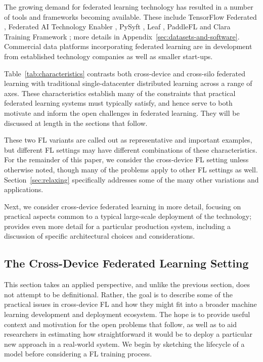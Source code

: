 \documentclass[11pt]{article}
\begin{document}
The growing demand for federated learning technology has resulted in a number of tools and frameworks becoming available. These include TensorFlow Federated \citep{tff}, Federated AI Technology Enabler \citep{FATE}, PySyft \citep{PySyft}, Leaf \citep{Leaf}, PaddleFL \citep{PaddleFL} and Clara Training Framework \citep{ClaraTraining};
more details in Appendix~\ref{sec:datasets-and-software}. Commercial data platforms incorporating federated learning are in development from established technology companies as well as smaller start-ups.

Table~\ref{tab:characteristics} contrasts both cross-device and cross-silo federated learning with traditional single-datacenter distributed learning across a range of axes. These characteristics establish many of the constraints that practical federated learning systems must typically satisfy, and hence serve to both motivate and inform the open challenges in federated learning. They will be discussed at length in the sections that follow.

These two FL variants are called out as representative and important examples, but different FL settings may have different combinations of these characteristics. For the remainder of this paper, we consider the cross-device FL setting unless otherwise noted, though many of the problems apply to other FL settings as well. Section~\ref{sec:relaxing} specifically addresses some of the many other variations and applications.

Next, we consider cross-device federated learning in more detail, focusing on practical aspects common to a typical large-scale deployment of the technology; \citet{bonawitz19sysml} provides even more detail for a particular production system, including a discussion of specific architectural choices and considerations.

\subsection{The Cross-Device Federated Learning Setting}
\label{subsec:cross-device-fl-setting}
This section takes an applied perspective, and unlike the previous section, does not attempt to be definitional. Rather, the goal is to describe some of the practical issues in cross-device FL and how they might fit into a broader machine learning development and deployment ecosystem. The hope is to provide useful context and motivation for the open problems that follow, as well as to aid researchers in estimating how straightforward it would be to deploy a particular new approach in a real-world system. We begin by sketching the lifecycle of a model before considering a FL training process.
\end{document}

